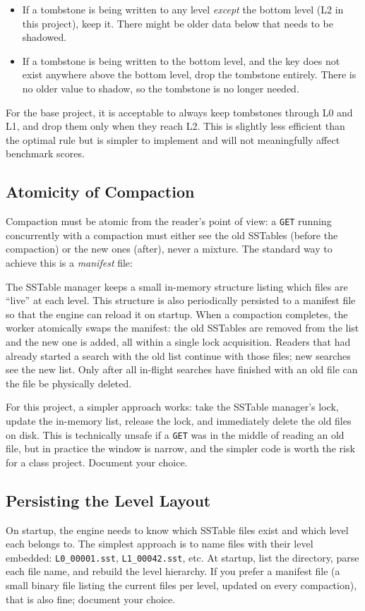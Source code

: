 \documentclass[11pt,a4paper]{article}
\begin{document}
\begin{itemize}
\item If a tombstone is being written to any level \textit{except} the bottom level (L2 in this project), keep it. There might be older data below that needs to be shadowed.
\item If a tombstone is being written to the bottom level, and the key does not exist anywhere above the bottom level, drop the tombstone entirely. There is no older value to shadow, so the tombstone is no longer needed.
\end{itemize}

For the base project, it is acceptable to always keep tombstones through L0 and L1, and drop them only when they reach L2. This is slightly less efficient than the optimal rule but is simpler to implement and will not meaningfully affect benchmark scores.

\subsection{Atomicity of Compaction}
Compaction must be atomic from the reader's point of view: a \texttt{GET} running concurrently with a compaction must either see the old SSTables (before the compaction) or the new ones (after), never a mixture. The standard way to achieve this is a \textit{manifest} file:

The SSTable manager keeps a small in-memory structure listing which files are ``live'' at each level. This structure is also periodically persisted to a manifest file so that the engine can reload it on startup. When a compaction completes, the worker atomically swaps the manifest: the old SSTables are removed from the list and the new one is added, all within a single lock acquisition. Readers that had already started a search with the old list continue with those files; new searches see the new list. Only after all in-flight searches have finished with an old file can the file be physically deleted.

For this project, a simpler approach works: take the SSTable manager's lock, update the in-memory list, release the lock, and immediately delete the old files on disk. This is technically unsafe if a \texttt{GET} was in the middle of reading an old file, but in practice the window is narrow, and the simpler code is worth the risk for a class project. Document your choice.

\subsection{Persisting the Level Layout}
On startup, the engine needs to know which SSTable files exist and which level each belongs to. The simplest approach is to name files with their level embedded: \texttt{L0\_00001.sst}, \texttt{L1\_00042.sst}, etc. At startup, list the directory, parse each file name, and rebuild the level hierarchy. If you prefer a manifest file (a small binary file listing the current files per level, updated on every compaction), that is also fine; document your choice.
\end{document}
